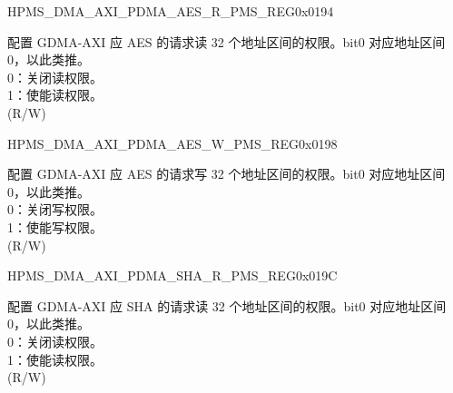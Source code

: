 \begin{register}{H}{PMS\_DMA\_AXI\_PDMA\_AES\_R\_PMS\_REG}{0x0194}\label{regdesc:PMSDMAAXIPDMAAESRPMSREG}
%
\regnewline%
\begin{regdesc}\begin{reglist}
\label{fielddesc:PMSDMAAXIPDMAAESRPMS}\item [PMS\_DMA\_AXI\_PDMA\_AES\_R\_PMS] 配置 GDMA-AXI 应 AES 的请求读 32 个地址区间的权限。bit0 对应地址区间 0，以此类推。\\
0：关闭读权限。\\
1：使能读权限。\\ (R/W)
\end{reglist}\end{regdesc}
\end{register}


\begin{register}{H}{PMS\_DMA\_AXI\_PDMA\_AES\_W\_PMS\_REG}{0x0198}\label{regdesc:PMSDMAAXIPDMAAESWPMSREG}
%
\regnewline%
\begin{regdesc}\begin{reglist}
\label{fielddesc:PMSDMAAXIPDMAAESWPMS}\item [PMS\_DMA\_AXI\_PDMA\_AES\_W\_PMS] 配置 GDMA-AXI 应 AES 的请求写 32 个地址区间的权限。bit0 对应地址区间 0，以此类推。\\
0：关闭写权限。\\
1：使能写权限。\\ (R/W)
\end{reglist}\end{regdesc}
\end{register}


\begin{register}{H}{PMS\_DMA\_AXI\_PDMA\_SHA\_R\_PMS\_REG}{0x019C}\label{regdesc:PMSDMAAXIPDMASHARPMSREG}
%
\regnewline%
\begin{regdesc}\begin{reglist}
\label{fielddesc:PMSDMAAXIPDMASHARPMS}\item [PMS\_DMA\_AXI\_PDMA\_SHA\_R\_PMS] 配置 GDMA-AXI 应 SHA 的请求读 32 个地址区间的权限。bit0 对应地址区间 0，以此类推。\\
0：关闭读权限。\\
1：使能读权限。\\ (R/W)
\end{reglist}\end{regdesc}
\end{register}


